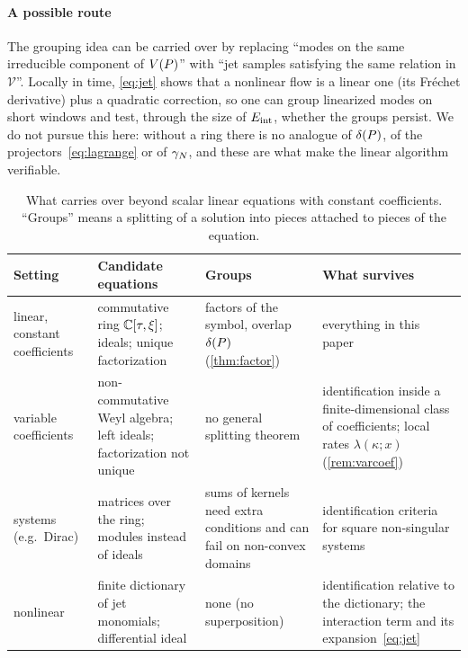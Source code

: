 \paragraph{A possible route} The grouping idea can be carried over by replacing ``modes on the same
irreducible component of $V(P)$'' with ``jet samples satisfying the same relation in $\mathcal V$''. Locally
in time, \eqref{eq:jet} shows that a nonlinear flow is a linear one (its Fr\'echet derivative) plus a
quadratic correction, so one can group linearized modes on short windows and test, through the size
of $E_{\mathrm{int}}$, whether the groups persist. We do not pursue this here: without a ring there is no
analogue of $\delta(P)$, of the projectors~\eqref{eq:lagrange} or of $\gamma_{N}$, and these are what make the
linear algorithm verifiable.

\begin{table}[tbp]
\centering\small
\caption{What carries over beyond scalar linear equations with constant coefficients. ``Groups'' means a splitting of
a solution into pieces attached to pieces of the equation.}\label{tab:beyond}
\begin{tabularx}{\linewidth}{@{}>{\raggedright\arraybackslash}p{2.3cm}>{\raggedright\arraybackslash}X>{\raggedright\arraybackslash}X>{\raggedright\arraybackslash}X@{}}
\toprule
Setting & Candidate equations & Groups & What survives\\
\midrule
linear, constant coefficients & commutative ring $\mathbb{C}[\tau,\xi]$; ideals; unique factorization & factors of the symbol, overlap $\delta(P)$ (\cref{thm:factor}) & everything in this paper\\
variable coefficients & non-commutative Weyl algebra; left ideals; factorization not unique & no general splitting theorem & identification inside a finite-dimensional class of coefficients; local rates $\lambda(\kappa;x)$ (\cref{rem:varcoef})\\
systems (e.g.\ Dirac) & matrices over the ring; modules instead of ideals & sums of kernels need extra conditions and can fail on non-convex domains & identification criteria for square non-singular systems\\
nonlinear & finite dictionary of jet monomials; differential ideal & none (no superposition) & identification relative to the dictionary; the interaction term and its expansion~\eqref{eq:jet}\\
\bottomrule
\end{tabularx}
\end{table}
